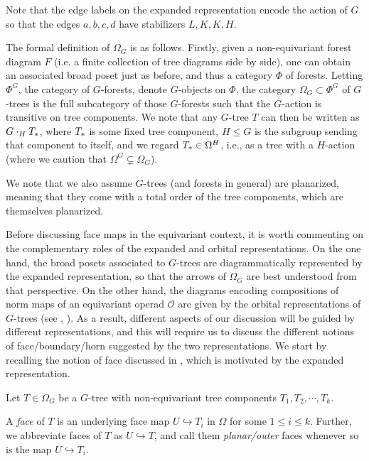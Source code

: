 \documentclass[a4paper,10pt,draft]{article}%
\begin{document}
Note that the edge labels on the expanded representation encode the action of $G$ so that the edges 
$a,b,c,d$ have stabilizers $L,K,K,H$.

The formal definition of $\Omega_G$ \cite[Def. 5.44]{Per17} is as follows.
Firstly, given a non-equivariant forest diagram $F$ 
(i.e. a finite collection of tree diagrams side by side),
one can obtain an associated broad poset just as before, and thus a category $\Phi$ of forests. Letting $\Phi^G$, the category of $G$-forests, denote $G$-objects on $\Phi$,
the category
$\Omega_G \subset \Phi^G$
of $G$-trees
is the full subcategory of those $G$-forests such that the $G$-action is transitive on tree components.
We note that any $G$-tree $T$ can then be written as
$G \cdot_H T_{\**}$, where $T_{\**}$ is some fixed tree component, $H\leq G$ is the subgroup sending that component to itself,
and we regard $T_{\**} \in \Omega^H$, i.e., as a tree with a $H$-action (where we caution that $\Omega^G \subsetneq \Omega_G$).

We note that we also assume $G$-trees (and forests in general) are planarized, meaning that they come with a total order of the tree components, which are themselves planarized.

Before discussing face maps in the equivariant context, it is worth commenting on the complementary roles of the expanded and orbital representations.
On the one hand, the broad posets associated to $G$-trees are diagrammatically represented by the expanded representation, so that the arrows of $\Omega_{G}$ are best understood from that perspective.
On the other hand, the diagrams encoding compositions of norm maps of an equivariant operad $\mathcal{O}$
are given by the orbital representations of  
$G$-trees (see \cite[Ex. 4.9]{Per17}, \cite[(1.10)]{BP17}).
As a result, different aspects of our discussion will be guided by different representations, and this will require us to discuss the different notions of face/boundary/horn suggested by the two representations.
We start by recalling the notion of face discussed in \cite{Per17}, which is motivated by the expanded representation.


\begin{definition}
	Let $T \in \Omega_G$ be a $G$-tree with non-equivariant tree components 
	$T_1, T_2,\cdots,T_k$.
	
	A \textit{face} of $T$ 
	is an underlying face map
	$U \hookrightarrow T_i$ in $\Omega$ for some $1 \leq i \leq k$.
	Further, we abbreviate faces of $T$ as
	$U \hookrightarrow T$,
	and call them \textit{planar/outer} faces
	whenever so is the map $U \hookrightarrow T_i$.
\end{definition}
\end{document}
